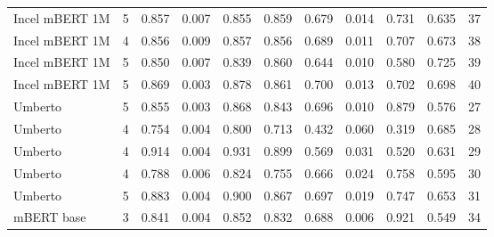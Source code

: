 \begin{tabular}{lrrrrrrrrrr}
    Incel mBERT 1M &      5 &                 0.857 &          0.007 &                  0.855 &                   0.859 &                 0.679 &           0.014 &                  0.731 &                   0.635 &  37 \\
    Incel mBERT 1M &      4 &                 0.856 &          0.009 &                  0.857 &                   0.856 &                 0.689 &           0.011 &                  0.707 &                   0.673 &  38 \\
    Incel mBERT 1M &      5 &                 0.850 &          0.007 &                  0.839 &                   0.860 &                 0.644 &           0.010 &                  0.580 &                   0.725 &  39 \\
    Incel mBERT 1M &      5 &                 0.869 &          0.003 &                  0.878 &                   0.861 &                 0.700 &           0.013 &                  0.702 &                   0.698 &  40 \\
           Umberto &      5 &                 0.855 &          0.003 &                  0.868 &                   0.843 &                 0.696 &           0.010 &                  0.879 &                   0.576 &  27 \\
           Umberto &      4 &                 0.754 &          0.004 &                  0.800 &                   0.713 &                 0.432 &           0.060 &                  0.319 &                   0.685 &  28 \\
           Umberto &      4 &                 0.914 &          0.004 &                  0.931 &                   0.899 &                 0.569 &           0.031 &                  0.520 &                   0.631 &  29 \\
           Umberto &      4 &                 0.788 &          0.006 &                  0.824 &                   0.755 &                 0.666 &           0.024 &                  0.758 &                   0.595 &  30 \\
           Umberto &      5 &                 0.883 &          0.004 &                  0.900 &                   0.867 &                 0.697 &           0.019 &                  0.747 &                   0.653 &  31 \\
        mBERT base &      3 &                 0.841 &          0.004 &                  0.852 &                   0.832 &                 0.688 &           0.006 &                  0.921 &                   0.549 &  34 \\

\end{tabular}
